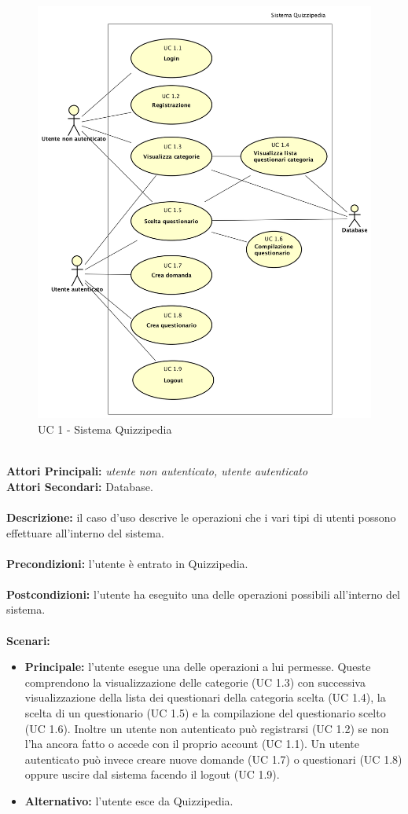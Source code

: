 \documentclass[a4paper,11pt]{article}
\begin{document}
\begin{figure}[h!]
\centering
\includegraphics[scale=0.5]{../immagini/UC1.png}
\caption{UC 1 - Sistema Quizzipedia}
\end{figure}
\ \\
\textbf{Attori Principali:} \textit{utente non autenticato, utente autenticato}
\\
\textbf{Attori Secondari:} Database.\\
\\
\textbf{Descrizione:} il caso d'uso descrive le operazioni che i vari tipi di utenti possono effettuare all'interno del sistema.\\
\\
\textbf{Precondizioni:} l'utente è entrato in Quizzipedia.\\
\\
\textbf{Postcondizioni:} l'utente ha eseguito una delle operazioni possibili all'interno del sistema.\\
\\
\textbf{Scenari:}
\begin{itemize}
\item \textbf{Principale: } l'utente esegue una delle operazioni a lui permesse. Queste comprendono la visualizzazione delle categorie (UC 1.3) con successiva visualizzazione della lista dei questionari della categoria scelta (UC 1.4), la scelta di un questionario (UC 1.5) e la compilazione del questionario scelto (UC 1.6). Inoltre un utente non autenticato può registrarsi (UC 1.2) se non l'ha ancora fatto o accede con il proprio account (UC 1.1). Un utente autenticato può invece creare nuove domande (UC 1.7) o questionari (UC 1.8) oppure uscire dal sistema facendo il logout (UC 1.9).
\item \textbf{Alternativo: } l'utente esce da Quizzipedia.
\end{itemize}
\newpage
\end{document}
